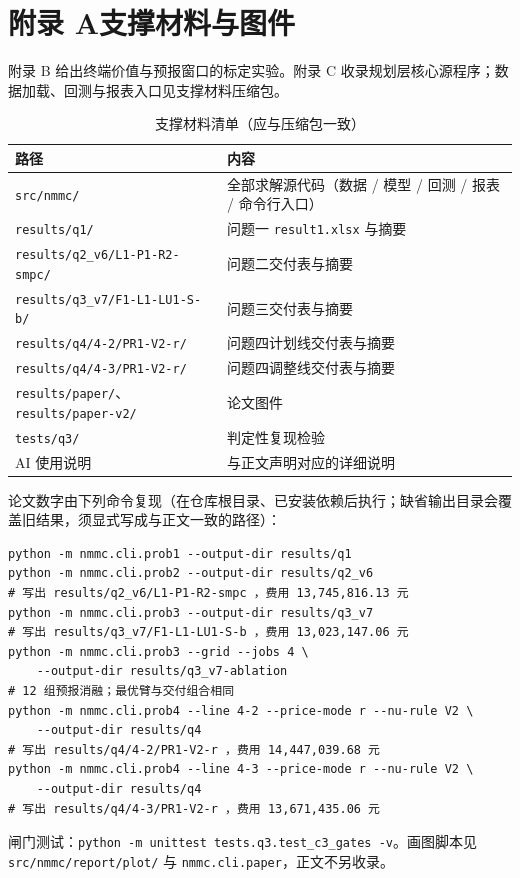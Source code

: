 \documentclass[12pt,a4paper]{ctexart}
\begin{document}
\newpage
\appendix

\section*{附录 A\quad 支撑材料与图件}
附录 B 给出终端价值与预报窗口的标定实验。附录 C 收录规划层核心源程序；数据加载、回测与报表入口见支撑材料压缩包。

\begin{table}[H]
\centering\small
\caption{支撑材料清单（应与压缩包一致）}
\begin{tabular}{ll}
\toprule
路径 & 内容 \\
\midrule
\texttt{src/nmmc/} & 全部求解源代码（数据 / 模型 / 回测 / 报表 / 命令行入口） \\
\texttt{results/q1/} & 问题一 \texttt{result1.xlsx} 与摘要 \\
\texttt{results/q2\_v6/L1-P1-R2-smpc/} & 问题二交付表与摘要 \\
\texttt{results/q3\_v7/F1-L1-LU1-S-b/} & 问题三交付表与摘要 \\
\texttt{results/q4/4-2/PR1-V2-r/} & 问题四计划线交付表与摘要 \\
\texttt{results/q4/4-3/PR1-V2-r/} & 问题四调整线交付表与摘要 \\
\texttt{results/paper/}、\texttt{results/paper-v2/} & 论文图件 \\
\texttt{tests/q3/} & 判定性复现检验 \\
AI 使用说明 & 与正文声明对应的详细说明 \\
\bottomrule
\end{tabular}
\end{table}

论文数字由下列命令复现（在仓库根目录、已安装依赖后执行；缺省输出目录会覆盖旧结果，须显式写成与正文一致的路径）：
\begin{lstlisting}[numbers=none,caption={复现正文交付数字的命令}]
python -m nmmc.cli.prob1 --output-dir results/q1
python -m nmmc.cli.prob2 --output-dir results/q2_v6
# 写出 results/q2_v6/L1-P1-R2-smpc ，费用 13,745,816.13 元
python -m nmmc.cli.prob3 --output-dir results/q3_v7
# 写出 results/q3_v7/F1-L1-LU1-S-b ，费用 13,023,147.06 元
python -m nmmc.cli.prob3 --grid --jobs 4 \
    --output-dir results/q3_v7-ablation
# 12 组预报消融；最优臂与交付组合相同
python -m nmmc.cli.prob4 --line 4-2 --price-mode r --nu-rule V2 \
    --output-dir results/q4
# 写出 results/q4/4-2/PR1-V2-r ，费用 14,447,039.68 元
python -m nmmc.cli.prob4 --line 4-3 --price-mode r --nu-rule V2 \
    --output-dir results/q4
# 写出 results/q4/4-3/PR1-V2-r ，费用 13,671,435.06 元
\end{lstlisting}
闸门测试：\texttt{python -m unittest tests.q3.test\_c3\_gates -v}。画图脚本见 \texttt{src/nmmc/report/plot/} 与 \texttt{nmmc.cli.paper}，正文不另收录。
\end{document}

